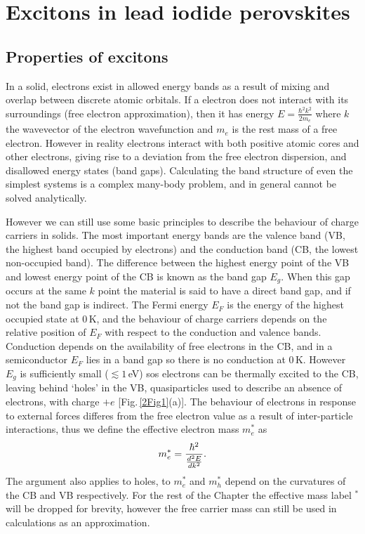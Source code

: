 
\chapter{Excitons in lead iodide perovskites}

\graphicspath{{Chapter2/Figures/}}

\section{Properties of excitons}
In a solid, electrons exist in allowed energy bands as a result of mixing and overlap between discrete atomic orbitals. If a electron does not interact with its surroundings (free electron approximation), then it has energy $E=\frac{\hbar^2k^2}{2m_e}$ where $k$ the wavevector of the electron wavefunction and $m_e$ is the rest mass of a free electron. However in reality electrons interact with both positive atomic cores and other electrons, giving rise to a deviation from the free electron dispersion, and disallowed energy states (band gaps). Calculating the band structure of even the simplest systems is a complex many-body problem, and in general cannot be solved analytically.

However we can still use some basic principles to describe the behaviour of charge carriers in solids. The most important energy bands are the valence band (VB, the highest band occupied by electrons) and the conduction band (CB, the lowest non-occupied band). The difference between the highest energy point of the VB and lowest energy point of the CB is known as the band gap $E_g$. When this gap occurs at the same $k$ point the material is said to have a direct band gap, and if not the band gap is indirect. The Fermi energy $E_F$ is the energy of the highest occupied state at 0\,K, and the behaviour of charge carriers depends on the relative position of $E_F$ with respect to the conduction and valence bands. Conduction depends on the availability of free electrons in the CB, and in a semiconductor $E_F$ lies in a band gap so there is no conduction at 0\,K. However $E_g$ is sufficiently small ($\lesssim1$\,eV) sos electrons can be thermally excited to the CB, leaving behind `holes' in the VB, quasiparticles used to describe an absence of electrons, with charge $+e$ [Fig.\,\ref{2Fig1}(a)]. The behaviour of electrons in response to external forces differes from the free electron value as a result of inter-particle interactions, thus we define the effective electron mass $m_e^*$ as
\begin{equation}
\centering
m_e^{*} = \frac{\hbar^2}{\frac{d^2E}{dk^2}} .
\label{effectivemass}
\end{equation}
The argument also applies to holes, to $m_e^*$ and $m_h^*$ depend on the curvatures of the CB and VB respectively. For the rest of the Chapter the effective mass label $^*$ will be dropped for brevity, however the free carrier mass can still be used in calculations as an approximation.

